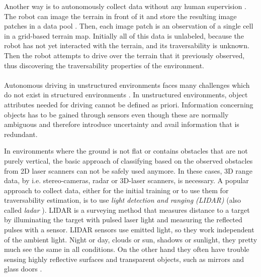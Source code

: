 \documentclass[12pt,a4paper,table,dvipsnames,tikz]{report}
\newcommand{\term}{\textit}
\newcommand{\acronym}{\MakeUppercase}
\begin{document}
	Another way is to autonomously collect data without any human supervision 
	\citep{Kim, Lee}. The robot can image the terrain in front of it and store the 
	resulting image patches in a data pool \citep{Kim}. Then, each image patch is an 
	observation of a single cell in a grid-based terrain map. Initially all of this 
	data is unlabeled, because the robot has not yet interacted with the terrain, and 
	its traversability is unknown. Then the robot attempts to drive over the 
	terrain that it previously observed, thus discovering the traversability 
	properties of the environment.
	\\\\
	
	
	Autonomous driving in unstructured environments faces many challenges which do 
	not exist in structured environments \citep{Shabbir}. In unstructured environments, 
	object attributes needed for driving cannot be defined as priori. Information 
	concerning objects has to be gained through sensors even though these are normally 
	ambiguous and therefore introduce uncertainty and avail information that is 
	redundant.
	\par
	In environments where the ground is not flat or contains obstacles that are 
	not purely vertical, the basic approach of classifying based on the observed 
	obstacles from \acronym{2d} laser scanners can not be safely used anymore. 
	In these cases, \acronym{3d} range data, by i.e. stereo-cameras, radar or 
	\acronym{3d}-laser scanners, is necessary. A popular approach to collect data, 
	either for the initial training or to use them for traversability estimation, is to use 
	\term{light detection and ranging (\acronym{lidar})} \citep{Suger, Lalonde} (also 
	called \term{ladar} \citep{Lalonde, Shneier}). \acronym{lidar} is a surveying 
	method that measures distance to a target by illuminating the target with pulsed 
	laser light and measuring the reflected pulses with a sensor. \acronym{lidar} 
	sensors use emitted light, so they work independent of the ambient light. Night 
	or day, clouds or sun, shadows or sunlight, they pretty much see the same in all 
	conditions. On the other hand they often have trouble sensing highly reflective 
	surfaces and transparent objects, such as mirrors and glass doors 
	\citep{HiroseGonet}.
	\par
\end{document}
